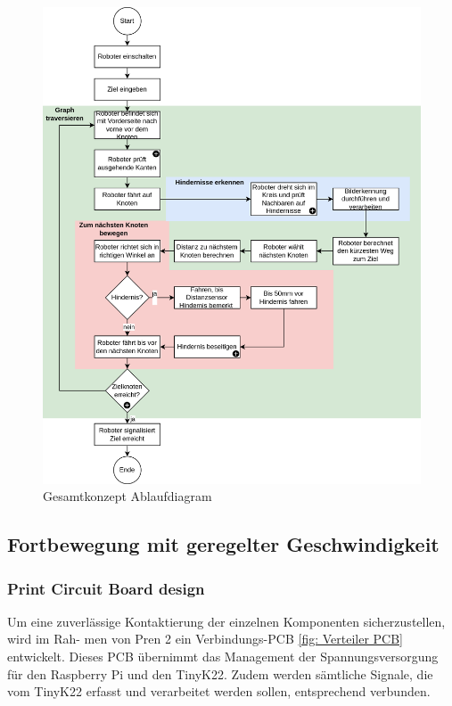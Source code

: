 \begin{figure}[H]
\centering
\includegraphics[width=\textwidth]{assets/gesamtkonzept/ablaufdiagramm.png}
\caption{Gesamtkonzept Ablaufdiagram}
\label{fig:ablauf}
\end{figure}

\subsection{Fortbewegung mit geregelter Geschwindigkeit}

\subsubsection{Print Circuit Board design}
\label{pcb}

Um eine zuverlässige Kontaktierung der einzelnen Komponenten sicherzustellen, wird im Rah-
men von Pren 2 ein Verbindungs-PCB \ref{fig: Verteiler PCB} entwickelt. Dieses PCB übernimmt das Management der
Spannungsversorgung für den Raspberry Pi und den TinyK22. Zudem werden sämtliche Signale,
die vom TinyK22 erfasst und verarbeitet werden sollen, entsprechend verbunden.

